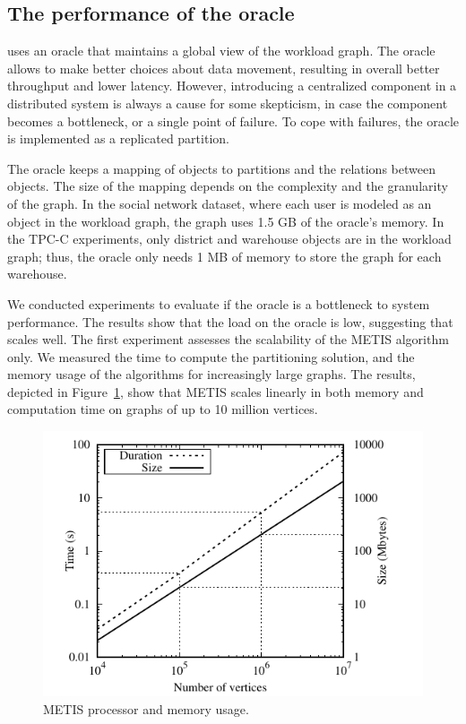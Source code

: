 \subsection{The performance of the oracle}

\dynastar  uses an oracle that maintains a global view of the workload graph.
The oracle allows \dynastar to make better choices about data movement,
resulting in overall better throughput and lower latency. However, introducing a
centralized component in a distributed system is always a cause for some
skepticism, in case the component becomes a bottleneck, or a single point of
failure. To cope with failures, the oracle is implemented as a replicated
partition.

The oracle keeps a mapping of objects to partitions and the relations between
objects. The size of the mapping depends on the complexity and the granularity
of the graph. In the social network dataset, where each user is modeled as an
object in the workload graph, the graph uses 1.5 GB of the oracle's memory. In
the TPC-C experiments, only district and warehouse objects are in the workload
graph; thus, the oracle only needs 1 MB of memory to store the graph for each
warehouse.

We conducted experiments to evaluate if the \dynastar oracle is a bottleneck
to system performance. The results show that the load on the oracle is low,
suggesting that \dynastar scales well. The first experiment assesses the
scalability of the METIS algorithm only. We measured the time to compute the
partitioning solution, and the memory usage of the algorithms for increasingly
large graphs. The results, depicted in Figure~\ref{fig:metis_size_time}, show
that METIS scales linearly in both memory and computation time on graphs of up
to 10 million vertices.

\begin{figure}[ht!]
  \centering
    \includegraphics[width=0.7\columnwidth]{./figures/experiments/dynastar/metis_size_time}
	\caption{METIS processor and memory usage.}
	\label{fig:metis_size_time}
\end{figure}

